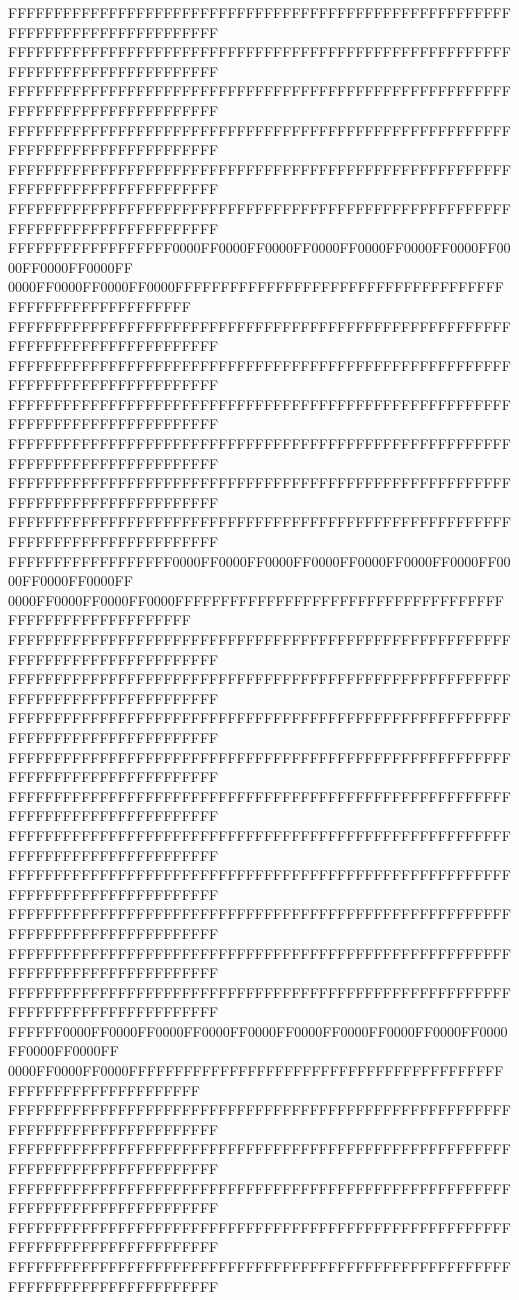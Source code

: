 FFFFFFFFFFFFFFFFFFFFFFFFFFFFFFFFFFFFFFFFFFFFFFFFFFFFFFFFFFFFFFFFFFFFFFFFFFFFFF
FFFFFFFFFFFFFFFFFFFFFFFFFFFFFFFFFFFFFFFFFFFFFFFFFFFFFFFFFFFFFFFFFFFFFFFFFFFFFF
FFFFFFFFFFFFFFFFFFFFFFFFFFFFFFFFFFFFFFFFFFFFFFFFFFFFFFFFFFFFFFFFFFFFFFFFFFFFFF
FFFFFFFFFFFFFFFFFFFFFFFFFFFFFFFFFFFFFFFFFFFFFFFFFFFFFFFFFFFFFFFFFFFFFFFFFFFFFF
FFFFFFFFFFFFFFFFFFFFFFFFFFFFFFFFFFFFFFFFFFFFFFFFFFFFFFFFFFFFFFFFFFFFFFFFFFFFFF
FFFFFFFFFFFFFFFFFFFFFFFFFFFFFFFFFFFFFFFFFFFFFFFFFFFFFFFFFFFFFFFFFFFFFFFFFFFFFF
FFFFFFFFFFFFFFFFFF0000FF0000FF0000FF0000FF0000FF0000FF0000FF0000FF0000FF0000FF
0000FF0000FF0000FF0000FFFFFFFFFFFFFFFFFFFFFFFFFFFFFFFFFFFFFFFFFFFFFFFFFFFFFFFF
FFFFFFFFFFFFFFFFFFFFFFFFFFFFFFFFFFFFFFFFFFFFFFFFFFFFFFFFFFFFFFFFFFFFFFFFFFFFFF
FFFFFFFFFFFFFFFFFFFFFFFFFFFFFFFFFFFFFFFFFFFFFFFFFFFFFFFFFFFFFFFFFFFFFFFFFFFFFF
FFFFFFFFFFFFFFFFFFFFFFFFFFFFFFFFFFFFFFFFFFFFFFFFFFFFFFFFFFFFFFFFFFFFFFFFFFFFFF
FFFFFFFFFFFFFFFFFFFFFFFFFFFFFFFFFFFFFFFFFFFFFFFFFFFFFFFFFFFFFFFFFFFFFFFFFFFFFF
FFFFFFFFFFFFFFFFFFFFFFFFFFFFFFFFFFFFFFFFFFFFFFFFFFFFFFFFFFFFFFFFFFFFFFFFFFFFFF
FFFFFFFFFFFFFFFFFFFFFFFFFFFFFFFFFFFFFFFFFFFFFFFFFFFFFFFFFFFFFFFFFFFFFFFFFFFFFF
FFFFFFFFFFFFFFFFFF0000FF0000FF0000FF0000FF0000FF0000FF0000FF0000FF0000FF0000FF
0000FF0000FF0000FF0000FFFFFFFFFFFFFFFFFFFFFFFFFFFFFFFFFFFFFFFFFFFFFFFFFFFFFFFF
FFFFFFFFFFFFFFFFFFFFFFFFFFFFFFFFFFFFFFFFFFFFFFFFFFFFFFFFFFFFFFFFFFFFFFFFFFFFFF
FFFFFFFFFFFFFFFFFFFFFFFFFFFFFFFFFFFFFFFFFFFFFFFFFFFFFFFFFFFFFFFFFFFFFFFFFFFFFF
FFFFFFFFFFFFFFFFFFFFFFFFFFFFFFFFFFFFFFFFFFFFFFFFFFFFFFFFFFFFFFFFFFFFFFFFFFFFFF
FFFFFFFFFFFFFFFFFFFFFFFFFFFFFFFFFFFFFFFFFFFFFFFFFFFFFFFFFFFFFFFFFFFFFFFFFFFFFF
FFFFFFFFFFFFFFFFFFFFFFFFFFFFFFFFFFFFFFFFFFFFFFFFFFFFFFFFFFFFFFFFFFFFFFFFFFFFFF
FFFFFFFFFFFFFFFFFFFFFFFFFFFFFFFFFFFFFFFFFFFFFFFFFFFFFFFFFFFFFFFFFFFFFFFFFFFFFF
FFFFFFFFFFFFFFFFFFFFFFFFFFFFFFFFFFFFFFFFFFFFFFFFFFFFFFFFFFFFFFFFFFFFFFFFFFFFFF
FFFFFFFFFFFFFFFFFFFFFFFFFFFFFFFFFFFFFFFFFFFFFFFFFFFFFFFFFFFFFFFFFFFFFFFFFFFFFF
FFFFFFFFFFFFFFFFFFFFFFFFFFFFFFFFFFFFFFFFFFFFFFFFFFFFFFFFFFFFFFFFFFFFFFFFFFFFFF
FFFFFFFFFFFFFFFFFFFFFFFFFFFFFFFFFFFFFFFFFFFFFFFFFFFFFFFFFFFFFFFFFFFFFFFFFFFFFF
FFFFFF0000FF0000FF0000FF0000FF0000FF0000FF0000FF0000FF0000FF0000FF0000FF0000FF
0000FF0000FF0000FFFFFFFFFFFFFFFFFFFFFFFFFFFFFFFFFFFFFFFFFFFFFFFFFFFFFFFFFFFFFF
FFFFFFFFFFFFFFFFFFFFFFFFFFFFFFFFFFFFFFFFFFFFFFFFFFFFFFFFFFFFFFFFFFFFFFFFFFFFFF
FFFFFFFFFFFFFFFFFFFFFFFFFFFFFFFFFFFFFFFFFFFFFFFFFFFFFFFFFFFFFFFFFFFFFFFFFFFFFF
FFFFFFFFFFFFFFFFFFFFFFFFFFFFFFFFFFFFFFFFFFFFFFFFFFFFFFFFFFFFFFFFFFFFFFFFFFFFFF
FFFFFFFFFFFFFFFFFFFFFFFFFFFFFFFFFFFFFFFFFFFFFFFFFFFFFFFFFFFFFFFFFFFFFFFFFFFFFF
FFFFFFFFFFFFFFFFFFFFFFFFFFFFFFFFFFFFFFFFFFFFFFFFFFFFFFFFFFFFFFFFFFFFFFFFFFFFFF
